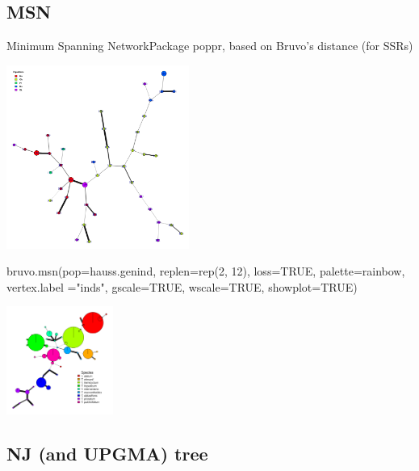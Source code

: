 \documentclass[compress, ucs, xelatex, 11pt, xcolor=svgnames,
  hyperref={
    bookmarks=true,
    unicode=true,
    colorlinks=true,
    pdftitle={Molecular data in R},
    plainpages=false,
    pdfauthor={Vojtech Zeisek},
    pdfsubject={Course about phylogeny and evolution in R},
    pdfcreator={XeLaTeX},
    pdfkeywords={R, evolution, phylogeny, molecular data},
    linkcolor=Tomato,
    anchorcolor=SaddleBrown,
    citecolor=Goldenrod,
    filecolor=DarkMagenta,
    menucolor=Sienna,
    urlcolor=DarkTurquoise,
    pdftex},
  url={hyphens, lowtilde} %
  ]{beamer}
\begin{document}
\subsection{MSN}

\begin{frame}[fragile]{Minimum Spanning Network}{Package poppr, based on Bruvo's distance (for SSRs)}
\begin{multicols}{2}
  \includegraphics[height=6cm]{msn.png}
  \columnbreak
  \begin{spluscode}
    bruvo.msn(pop=hauss.genind,
      replen=rep(2, 12), loss=TRUE,
      palette=rainbow, vertex.label
      ="inds", gscale=TRUE,
      wscale=TRUE, showplot=TRUE)
  \end{spluscode}
  \begin{center}
    \includegraphics[width=3.5cm]{msn-bruvo_no_labels.png}
  \end{center}
\end{multicols}
\end{frame}

\subsection{NJ (and UPGMA) tree}
\end{document}
